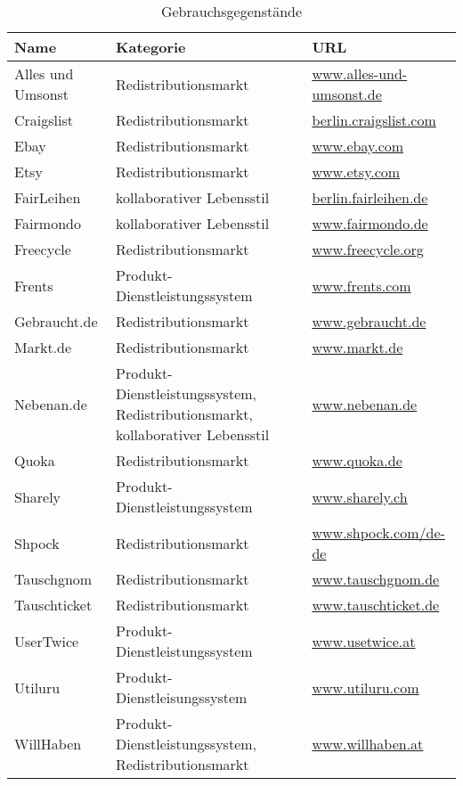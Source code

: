 \documentclass[a4paper]{scrartcl}
\begin{document}
		\begin{table}[h]
			\begin{tabular}{lll}
				Name & Kategorie & URL\\ \hline
				Alles und Umsonst & Redistributionsmarkt & \url{www.alles-und-umsonst.de}\\
				Craigslist & Redistributionsmarkt & \url{berlin.craigslist.com}\\
				Ebay & Redistributionsmarkt & \url{www.ebay.com}\\
				Etsy & Redistributionsmarkt & \url{www.etsy.com}\\
				FairLeihen & kollaborativer Lebensstil & \url{berlin.fairleihen.de}\\
				Fairmondo & kollaborativer Lebensstil & \url{www.fairmondo.de}\\
				Freecycle & Redistributionsmarkt & \url{www.freecycle.org}\\
				Frents & Produkt-Dienstleistungssystem & \url{www.frents.com}\\
				Gebraucht.de & Redistributionsmarkt & \url{www.gebraucht.de}\\
				Markt.de & Redistributionsmarkt & \url{www.markt.de}\\
				Nebenan.de & \multicolumn{1}{p{4cm}}{Produkt-Dienstleistungssystem, Redistributionsmarkt, kollaborativer Lebensstil} &  \url{www.nebenan.de}\\
				Quoka & Redistributionsmarkt & \url{www.quoka.de}\\
				Sharely & Produkt-Dienstleistungssystem & \url{www.sharely.ch}\\
				Shpock & Redistributionsmarkt & \url{www.shpock.com/de-de}\\
				Tauschgnom & Redistributionsmarkt & \url{www.tauschgnom.de}\\
				Tauschticket & Redistributionsmarkt & \url{www.tauschticket.de}\\
				UserTwice & Produkt-Dienstleistungssystem & \url{www.usetwice.at}\\
				Utiluru & Produkt-Dienstleisungssystem & \url{www.utiluru.com}\\
				WillHaben & \multicolumn{1}{p{4cm}}{Produkt-Dienstleistungssystem, Redistributionsmarkt} & \url{www.willhaben.at}
			\end{tabular}
		\caption{Gebrauchsgegenst\"ande}
		\label{tab:Gebrauchsgegenst\"ande}
		\end{table}
	
\end{document}

